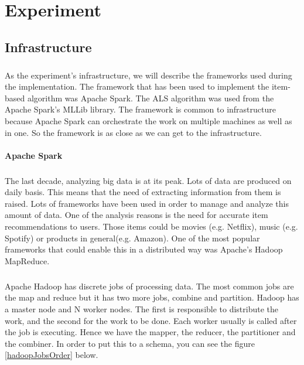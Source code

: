 \newpage
\chapter{Experiment}
\section{Infrastructure}
\paragraph{}As the experiment's infrastructure, we will describe the frameworks used during the implementation. The framework that has been used to implement the item-based algorithm was Apache Spark. The ALS algorithm was used from the Apache Spark's MLLib library. The framework is common to infrastructure because Apache Spark can orchestrate the work on multiple machines as well as in one. So the framework is as close as we can get to the infrastructure.

\subsubsection{Apache Spark}
\paragraph{}The last decade, analyzing big data is at its peak. Lots of data are produced on daily basis. This means that the need of extracting information from them is raised. 
Lots of frameworks have been used in order to manage and analyze this amount of data. One of the analysis reasons is the need for accurate item recommendations to users. Those items could be movies (e.g. Netflix), music (e.g. Spotify) or products in general(e.g. Amazon). One of the most popular frameworks that could enable this in a distributed way was Apache's Hadoop MapReduce.


\paragraph{}Apache Hadoop has discrete jobs of processing data. The most common jobs are the map and reduce but it has two more jobs, combine and partition. Hadoop has a master node and N worker nodes. The first is responsible to distribute the work, and the second for the work to be done. Each worker usually is called after the job is executing. Hence we have the mapper, the reducer, the partitioner and the combiner. In order to put this to a schema, you can see the figure \ref{hadoopJobsOrder} below.

